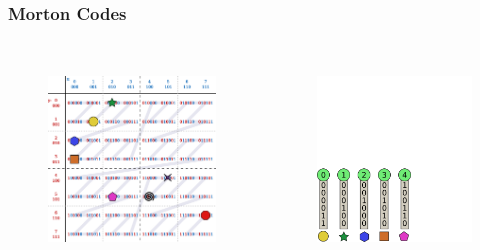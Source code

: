 \documentclass{beamer}
\begin{document}
\begin{frame}
  \frametitle{Morton Codes}
  
\begin{columns}[t]

\begin{figure}
\includegraphics[height=55mm]{Z-curve-primitives.png}
\end{figure}

\begin{figure}
\includegraphics[height=55mm]{keys_4.png}
\end{figure}
\end{columns}
\end{frame}
\end{document}
